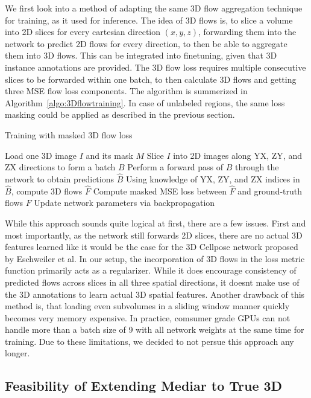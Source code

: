 We first look into a method of adapting the same 3D flow aggregation technique for training, as it used for inference. The idea of 3D flows is, to slice a volume into 2D slices for every cartesian direction $(x, y, z)$, forwarding them into the network to predict 2D flows for every direction, to then be able to aggregate them into 3D flows. This can be integrated into finetuning, given that 3D instance annotations are provided. The 3D flow loss requires multiple consecutive slices to be forwarded within one batch, to then calculate 3D flows and getting three MSE flow loss components. The algorithm is summerized in Algorithm~\ref{algo:3Dflowtraining}. In case of unlabeled regions, the same loss masking could be applied as described in the previous section.

\begin{algorithm}[H]
\caption{Training with masked 3D flow loss}
\label{algo:3Dflowtraining}
\begin{algorithmic}[1]
    \STATE Load one 3D image $I$ and its mask $M$
    \STATE Slice $I$ into 2D images along YX, ZY, and ZX directions to form a batch $B$
    \STATE Perform a forward pass of $B$ through the network to obtain predictions $\hat{B}$
    \STATE Using knowledge of YX, ZY, and ZX indices in $\hat{B}$, compute 3D flows $\hat{F}$
    \STATE Compute masked MSE loss between $\hat{F}$ and ground-truth flows $F$
    \STATE Update network parameters via backpropagation
\ENDFOR
\end{algorithmic}
\end{algorithm}

While this approach sounds quite logical at first, there are a few issues. First and most importantly, as the network still forwards 2D slices, there are no actual 3D features learned like it would be the case for the 3D Cellpose network proposed by Eschweiler et al. In our setup, the incorporation of 3D flows in the loss metric function primarily acts as a regularizer. While it does encourage consistency of predicted flows across slices in all three spatial directions, it doesnt make use of the 3D annotations to learn actual 3D spatial features. Another drawback of this method is, that loading even subvolumes in a sliding window manner quickly becomes very memory expensive. In practice, comsumer grade GPUs can not handle more than a batch size of 9 with all network weights at the same time for training. Due to these limitations, we decided to not persue this approach any longer.  

\subsection{Feasibility of Extending Mediar to True 3D}

